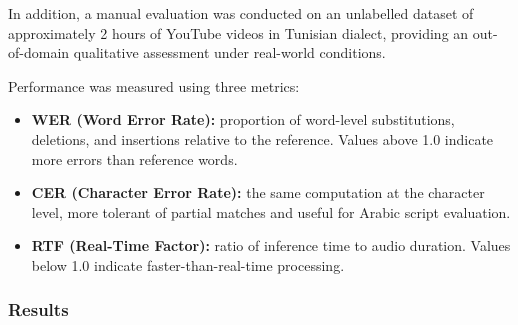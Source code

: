 \documentclass[12pt,a4paper]{report}
\begin{document}
In addition, a manual evaluation was conducted on an unlabelled dataset of approximately
2 hours of YouTube videos in Tunisian dialect, providing an out-of-domain qualitative
assessment under real-world conditions.

Performance was measured using three metrics:
\begin{itemize}
    \item \textbf{WER (Word Error Rate):} proportion of word-level substitutions, deletions,
    and insertions relative to the reference. Values above 1.0 indicate more errors than
    reference words.
    \item \textbf{CER (Character Error Rate):} the same computation at the character level,
    more tolerant of partial matches and useful for Arabic script evaluation.
    \item \textbf{RTF (Real-Time Factor):} ratio of inference time to audio duration.
    Values below 1.0 indicate faster-than-real-time processing.
\end{itemize}

\subsubsection*{Results}
\end{document}
